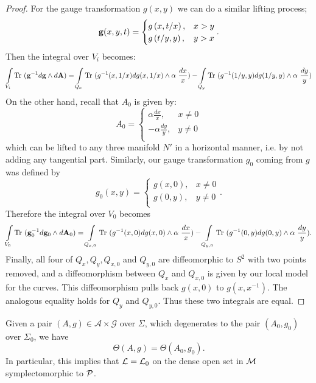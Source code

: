 \begin{proof}
		For the gauge transformation $g(x,y)$ we can do a similar lifting process;
		\begin{equation}
			\mathbf{g}(x,y,t) =\begin{cases}
			g\left(x,t/x\right), & x>y\\
			g\left(t/y,y\right), & y>x\\
			\end{cases}.
		\end{equation}
		Then the integral over $V_i$ becomes:
		\begin{align*}
			\int\limits_{V_i} \text{Tr }(\mathbf{g}^{-1}d\mathbf{g}\wedge d\mathbf{A}) = \int\limits_{Q_x} \text{Tr }(g^{-1}(x,1/x)dg(x,1/x)\wedge \alpha~ \frac{dx}{x}) - \int\limits_{Q_y} \text{Tr }(g^{-1}(1/y,y)dg(1/y,y)\wedge \alpha~ \frac{dy}{y})
		\end{align*}
		On the other hand, recall that $A_0$ is given by:
		\begin{equation}
			A_0 = \begin{cases}
			\alpha \frac{dx}{x}, & x\neq 0\\
			-\alpha \frac{dy}{y}, & y\neq 0\\
			\end{cases}
		\end{equation}
		which can be lifted to any three manifold $N'$ in a horizontal manner, i.e. by not adding any tangential part. Similarly, our gauge transformation $g_0$ coming from $g$ was defined by 
		\begin{equation}
		g_0(x,y) =\begin{cases}
		g\left(x,0\right), & x\neq 0\\
		g\left(0,y\right), & y \neq 0 \\
		\end{cases}.
		\end{equation}
		Therefore the integral over $V_0$ becomes
		\begin{align*}
		\int\limits_{V_0} \text{Tr }(\mathbf{g}_0^{-1}d\mathbf{g}_0\wedge d\mathbf{A}_0) = \int\limits_{Q_{x,0}} \text{Tr }(g^{-1}(x,0)dg(x,0)\wedge \alpha~ \frac{dx}{x}) - \int\limits_{Q_{y,0}} \text{Tr }(g^{-1}(0,y)dg(0,y)\wedge \alpha~ \frac{dy}{y}).
		\end{align*}
		Finally, all four of $Q_x,Q_y, Q_{x,0}$ and $Q_{y,0}$ are diffeomorphic to $S^2$ with two points removed, and a diffeomorphism between $Q_x$ and $Q_{x,0}$ is given by our local model for the curves. This diffeomorphism pulls back $g(x,0)$ to $g(x,x^{-1})$. The analogous equality holds for $Q_y$ and $Q_{y,0}$. Thus these two integrals are equal.
	\end{proof}
	\begin{theorem}
		Given a pair $(A,g) \in \mathcal{A}\times\mathcal{G}$ over $\Sigma$, which degenerates to the pair $(A_0, g_0)$ over $\Sigma_0$, we have
		\begin{equation}
			\Theta(A,g) = \Theta(A_0, g_0).
		\end{equation}
		In particular, this implies that $\mathcal{L} = \mathcal{L}_0$ on the dense open set in $\mathcal{M}$ symplectomorphic to $\mathcal{P}$.
		\label{t:l=l0}
	\end{theorem}
